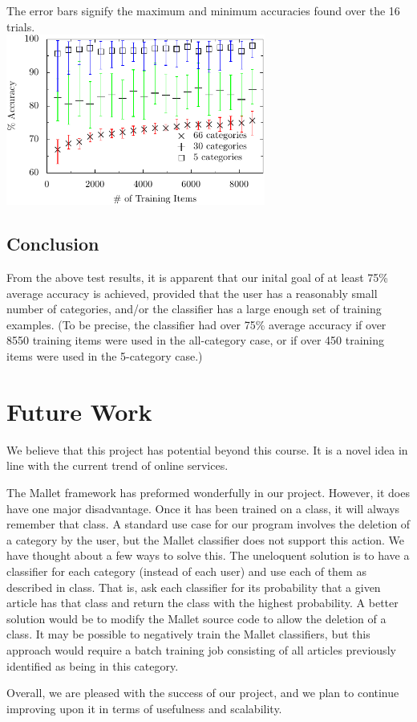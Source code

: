 \documentclass[letterpaper]{article}
\begin{document}
The error bars signify the maximum and minimum accuracies found over the 16 trials.\\

\noindent\includegraphics[width=3.35in]{data.pdf}

\subsection{Conclusion}
From the above test results, it is apparent that our inital goal of at least 75\% average accuracy is achieved, provided that the user has a reasonably small number of categories, and/or the classifier has a large enough set of training examples. (To be precise, the classifier had over 75\% average accuracy if over 8550 training items were used in the all-category case, or if over 450 training items were used in the 5-category case.)

\section{Future Work}
We believe that this project has potential beyond this course. It is a novel idea in line with the current trend of online services.

The Mallet framework has preformed wonderfully in our project. However, it does have one major disadvantage. Once it has been trained on a class, it will always remember that class. A standard use case for our program involves the deletion of a category by the user, but the Mallet classifier does not support this action. We have thought about a few ways to solve this. The uneloquent solution is to have a classifier for each category (instead of each user) and use each of them as described in class. That is, ask each classifier for its probability that a given article has that class and return the class with the highest probability. A better solution would be to modify the Mallet source code to allow the deletion of a class. It may be possible to negatively train the Mallet classifiers, but this approach would require a batch training job consisting of all articles previously identified as being in this category.

Overall, we are pleased with the success of our project, and we plan to continue improving upon it in terms of usefulness and scalability.



\end{document}
